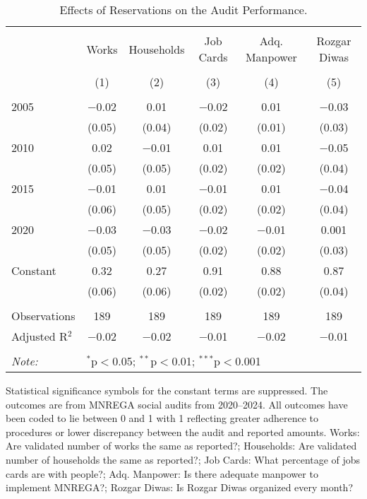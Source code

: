 \begin{table}[!htbp]
\centering
\begin{threeparttable}

  \caption{Effects of Reservations on the Audit Performance.} 
  \label{main_mnrega_audit_res} 
\scriptsize 
\begin{tabular}{@{\extracolsep{0pt}}lccccc} 
\\[-1.8ex]\hline 
\hline \\[-1.8ex] 
 & Works & Households & Job Cards & Adq. Manpower & Rozgar Diwas \\ 
\\[-1.8ex] & (1) & (2) & (3) & (4) & (5)\\ 
\hline \\[-1.8ex] 
 2005 & $-$0.02 & 0.01 & $-$0.02 & 0.01 & $-$0.03 \\ 
  & (0.05) & (0.04) & (0.02) & (0.01) & (0.03) \\ 
  2010 & 0.02 & $-$0.01 & 0.01 & 0.01 & $-$0.05 \\ 
  & (0.05) & (0.05) & (0.02) & (0.02) & (0.04) \\ 
  2015 & $-$0.01 & 0.01 & $-$0.01 & 0.01 & $-$0.04 \\ 
  & (0.06) & (0.05) & (0.02) & (0.02) & (0.04) \\ 
  2020 & $-$0.03 & $-$0.03 & $-$0.02 & $-$0.01 & 0.001 \\ 
  & (0.05) & (0.05) & (0.02) & (0.02) & (0.03) \\ 
  Constant & 0.32 & 0.27 & 0.91 & 0.88 & 0.87 \\ 
  & (0.06) & (0.06) & (0.02) & (0.02) & (0.04) \\ 
 \hline \\[-1.8ex] 
Observations & 189 & 189 & 189 & 189 & 189 \\ 
Adjusted R$^{2}$ & $-$0.02 & $-$0.02 & $-$0.01 & $-$0.02 & $-$0.01 \\ 
\hline 
\hline \\[-1.8ex] 
\textit{Note:}  & \multicolumn{5}{l}{$^{*}$p$<$0.05; $^{**}$p$<$0.01; $^{***}$p$<$0.001} \\ 
\end{tabular} 
\begin{tablenotes}[flushleft]
\scriptsize
\item[] Statistical significance symbols for the constant terms are suppressed. The outcomes are from MNREGA social audits from 2020--2024.
                                        All outcomes have been coded to lie between 0 and 1 with 1 reflecting greater 
                                        adherence to procedures or lower discrepancy between the audit and reported amounts.
                                        Works: Are validated number of works the same as reported?;
                                        Households: Are validated number of households the same as reported?;
                                        Job Cards: What percentage of jobs cards are with people?;
                                        Adq. Manpower: Is there adequate manpower to implement MNREGA?;
                                        Rozgar Diwas: Is Rozgar Diwas organized every month?
\end{tablenotes}
\end{threeparttable}
\end{table}
